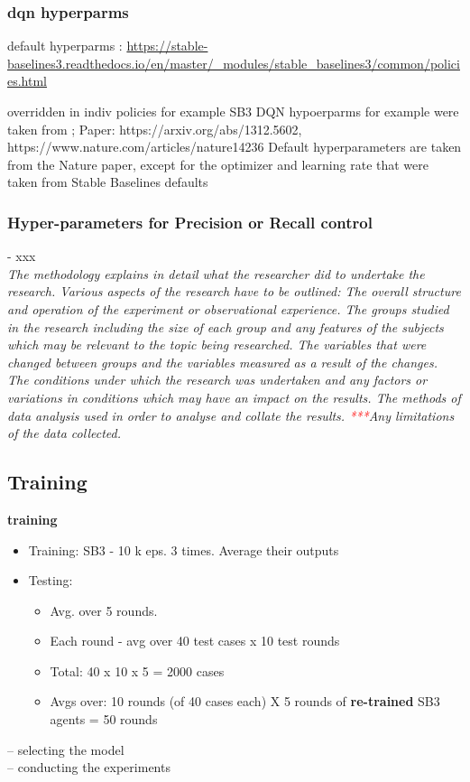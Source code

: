 \documentclass[a4paper, 12pt]{article}
\begin{document}
\subsubsection{dqn hyperparms}


default hyperparms : \url{https://stable-baselines3.readthedocs.io/en/master/_modules/stable_baselines3/common/policies.html}

overridden in indiv policies for example 
SB3 DQN hypoerparms for example were taken from ;
Paper: https://arxiv.org/abs/1312.5602, https://www.nature.com/articles/nature14236
Default hyperparameters are taken from the Nature paper,
except for the optimizer and learning rate that were taken from Stable Baselines defaults



\subsubsection{Hyper-parameters for Precision or Recall control}
- xxx\\




\textit{The methodology explains in detail what the researcher did to undertake the research. Various aspects of the research have to be outlined: The overall structure and operation of the experiment or observational experience. The groups studied in the research including the size of each group and any features of the subjects which may be relevant to the topic being researched. The variables that were changed between groups and the variables measured as a result of the changes. The conditions under which the research was undertaken and any factors or variations in conditions which may have an impact on the results. The methods of data analysis used in order to analyse and collate the results. \textcolor{red}{***}Any limitations of the data collected.}

\subsection{Training}
 \textbf{training}
 \begin{itemize}
 	\item Training: SB3 - 10 k eps. 3 times. Average their outputs
 	\item Testing: 
 	\begin{itemize}
 		\item Avg. over 5 rounds.
 		\item Each round - avg over 40 test cases x 10 test rounds
 		\item Total: 40 x 10 x 5 = 2000 cases
 		\item Avgs over: 10 rounds (of 40 cases each) X 5 rounds of \textbf{re-trained} SB3 agents = 50 rounds 
 	\end{itemize}
 \end{itemize}
 -- selecting the model\\
 -- conducting the experiments\\
\end{document}
